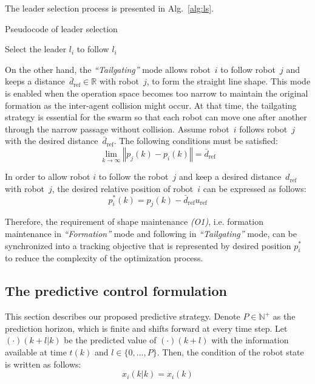 The leader selection process is presented in Alg.~\ref{alg:ls}.
\begin{algorithm}
\caption{Pseudocode of leader selection}
\label{alg:ls}
Select the leader $l_i$ to follow
\Return $l_i$\;
\end{algorithm}

On the other hand, the \textit{``Tailgating''} mode allows robot~$i$ to follow robot~$j$ and keeps a distance~$\bar{d}_\text{ref}\in\mathbb{R}$ with robot~$j$, to form the straight line shape. This mode is enabled when the operation space becomes too narrow to maintain the original formation as the inter-agent collision might occur. At that time, the tailgating strategy is essential for the swarm so that each robot can move one after another through the narrow passage without collision. Assume robot~$i$ follows robot~$j$ with the desired distance~$\bar{d}_\text{ref}$. The following conditions must be satisfied:
\begin{equation}
    \lim_{k\to\infty}{\left\Vert p_j(k)-p_i(k)\right\Vert}=\bar{d}_\text{ref}
\end{equation}

In order to allow robot $i$ to follow the robot~$j$ and keep a desired distance~$d_\text{ref}$ with robot~$j$, the desired relative position of robot~$i$ can be expressed as follows:
\begin{equation}
    p_i^*(k)= p_j(k)-\bar{d}_\text{ref}u_\text{ref}
    \label{eqn:tailgating}
\end{equation}

Therefore, the requirement of shape maintenance \textit{(O1)}, i.e. formation maintenance in \textit{``Formation''} mode and following in \textit{``Tailgating''} mode, can be synchronized into a tracking objective that is represented by desired position $p_i^*$ to reduce the complexity of the optimization process. 

\subsection{The predictive control formulation}
This section describes our proposed predictive strategy. Denote $P\in\mathbb{N}^+$ as the prediction horizon, which is finite and shifts forward at every time step. Let $(\cdot)(k+l|k )$ be the predicted value of $(\cdot)(k+l )$ with the information available at time $t(k)$ and $l \in\{0,...,P\}$. Then, the condition of the robot state is written as follows:
\begin{equation}
    x_i(k|k)=x_i(k)
\end{equation}

